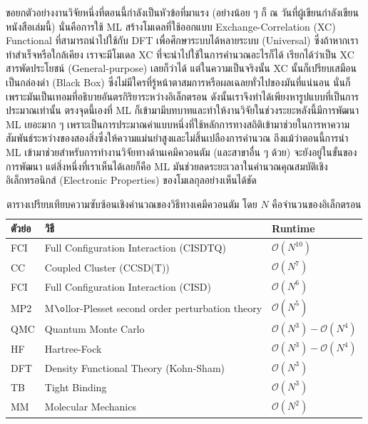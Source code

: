 ขอยกตัวอย่างงานวิจัยหนึ่งที่ตอนนี้กำลังเป็นหัวข้อที่มาแรง (อย่างน้อย ๆ ก็ ณ วันที่ผู้เขียนกำลังเขียนหนังสือเล่มนี้) นั่นคือการใช้ ML สร้างโมเดลที่ใช้ออกแบบ 
Exchange-Correlation (XC) Functional ที่สามารถนำไปใช้กับ DFT เพื่อศึกษาระบบได้หลายระบบ (Universal) ซึ่งถ้าหากเราทำสำเร็จหรือใกล้เคียง 
เราจะมีโมเดล XC ที่จะนำไปใช้ในการคำนวณอะไรก็ได้ เรียกได้ว่าเป็น XC สารพัดประโยชน์ (General-purpose) เลยก็ว่าได้ แต่ในความเป็นจริงนั้น 
XC นั้นก็เปรียบเสมือนเป็นกล่องดำ (Black Box) ซึ่งไม่มีใครที่รู้หน้าตาสมการหรือผลเฉลยทั่วไปของมันที่แน่นอน นั่นก็เพราะมันเป็นเทอมที่อธิบายอันตรกิริยาระหว่างอิเล็กตรอน 
ดังนั้นเราจึงทำได้เพียงหารูปแบบที่เป็นการประมาณเท่านั้น ตรงจุดนี้เองที่ ML ก็เข้ามามีบทบาทและทำให้งานวิจัยในช่วงระยะหลังนี้มีการพัฒนา ML เยอะมาก ๆ 
เพราะเป็นการประมาณค่าแบบหนึ่งที่ใช้หลักการทางสถิติเข้ามาช่วยในการหาความสัมพันธ์ระหว่างของสองสิ่งซึ่งให้ความแม่นยำสูงและไม่สิ้นเปลืองการคำนวณ 
ถึงแม้ว่าตอนนี้การนำ ML เข้ามาช่วยสำหรับการทำงานวิจัยทางด้านเคมึควอนตัม (และสาขาอื่น ๆ ด้วย) จะยังอยู่ในขั้นของการพัฒนา แต่สิ่งหนึ่งที่เราเห็นได้เลยก็คือ 
ML มันช่วยลดระยะเวลาในคำนวณคุณสมบัติเชิงอิเล็กทรอนิกส์ (Electronic Properties) ของโมเลกุลอย่างเห็นได้ชัด

\begin{table}[!htp]
    \centering
    \caption{ตารางเปรียบเทียบความซับซ้อนเชิงคำนวณของวิธีทางเคมีควอนตัม\cite{rupp2015} โดย $N$ คือจำนวนของอิเล็กตรอน}
    \label{tab:qm_complx}
    \small
    \begin{tabular}{lll}\toprule
    ตัวย่อ &วิธี &Runtime \\\midrule
    FCI &Full Configuration Interaction (CISDTQ) &$\mathcal{O}(N^{10})$ \\
    CC &Coupled Cluster (CCSD(T)) &$\mathcal{O}(N^{7})$ \\
    FCI &Full Configuration Interaction (CISD) &$\mathcal{O}(N^{6})$ \\
    MP2 &M$\o$llor-Plesset second order perturbation theory &$\mathcal{O}(N^{5})$ \\
    QMC &Quantum Monte Carlo &$\mathcal{O}(N^{3}) - \mathcal{O}(N^{4})$ \\
    HF &Hartree-Fock &$\mathcal{O}(N^{3}) - \mathcal{O}(N^{4})$ \\
    DFT &Density Functional Theory (Kohn-Sham) &$\mathcal{O}(N^{3})$ \\
    TB &Tight Binding &$\mathcal{O}(N^{3})$ \\
    MM &Molecular Mechanics &$\mathcal{O}(N^{2})$ \\
    \bottomrule
    \end{tabular}
\end{table}

